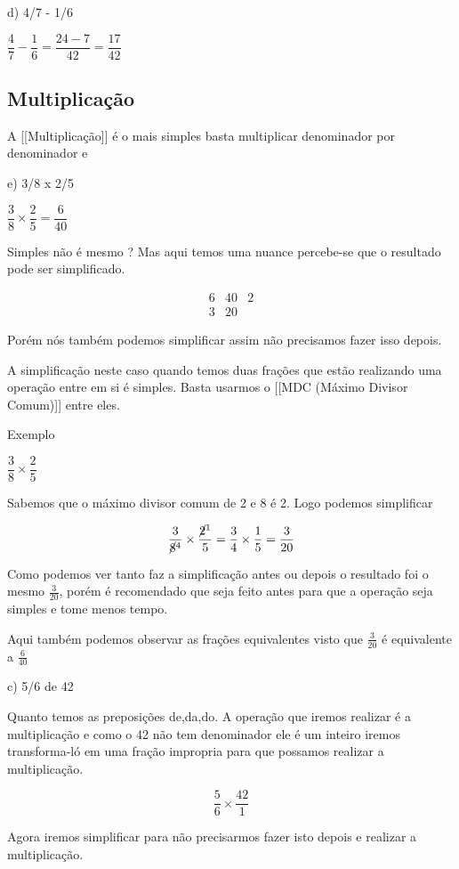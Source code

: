 \documentclass[letterpaper]{book}
\begin{document}
d) 4/7 - 1/6

\(\dfrac{4}{7} - \dfrac{1}{6} = \dfrac{24-7}{42} = \dfrac{17}{42}\)

\subsection{Multiplicação}

A [[Multiplicação]] é o mais simples basta multiplicar denominador por denominador e 

e) 3/8 x 2/5

\(\dfrac{3}{8} \times \dfrac{2}{5} = \dfrac{6}{40}\)

Simples não é mesmo ? Mas aqui temos uma nuance percebe-se que o resultado pode ser simplificado.

\[
\begin{array}{cc|cc}
6 & 40 & 2 \\
3 & 20 & 
\end{array}
\]

Porém nós também podemos simplificar assim não precisamos fazer isso depois.

A simplificação neste caso quando temos duas frações que estão realizando uma operação entre em si é simples. Basta usarmos o [[MDC (Máximo Divisor Comum)]] entre eles.

Exemplo

\(\dfrac{3}{8} \times \dfrac{2}{5}\) 

Sabemos que o máximo divisor comum de 2 e 8 é 2. Logo podemos simplificar


\[\dfrac{3}{\cancel 8^{4}} \times \dfrac{\cancel 2^{1}}{5} = \dfrac{3}{4} \times \dfrac{1}{5} = \dfrac{3}{20}\]

Como podemos ver tanto faz a simplificação antes ou depois o resultado foi o mesmo \(\frac{3}{20}\), porém é recomendado que seja feito antes para que a operação seja simples e tome menos tempo.

Aqui também podemos observar as frações equivalentes visto que \(\frac{3}{20}\) é equivalente a $\frac{6}{40}$


c) 5/6 de 42

Quanto temos as preposições de,da,do. A operação que iremos realizar é a multiplicação e como o 42 não tem denominador ele é um inteiro iremos transforma-ló em uma fração impropria para que possamos realizar a multiplicação.

\[\dfrac{5}{6} \times \dfrac{42}{1}\]

Agora iremos simplificar para não precisarmos fazer isto depois e realizar a multiplicação.
\end{document}
